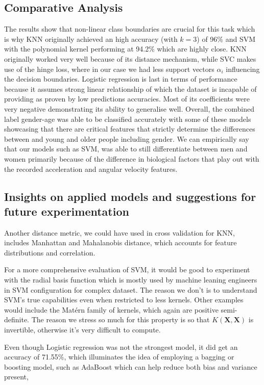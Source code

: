 \documentclass[10pt,twocolumn]{article}
\begin{document}
\subsection{Comparative Analysis}
The results show that non-linear class boundaries are crucial for this task which is why KNN originally achieved an high accuracy (with $k=3$) of 96\% and SVM with the polynomial kernel performing at 94.2\% which are highly close. KNN originally worked very well because of its distance mechanism, while SVC makes use of the hinge loss, where in our case we had less support vectors $\alpha_i$ influencing the decision boundaries. Logistic regression is last in terms of performance because it assumes strong linear relationship of which the dataset is incapable of providing as proven by low predictions accuracies. Most of its coefficients were very negative demonstrating its ability to generalise well. Overall, the combined label gender-age was able to be classified accurately with some of these models showcasing that there are critical features that strictly determine the differences between and young and older people including gender. We can empirically say that our models such as SVM, was able to still differentiate between men and women primarily because of the difference in biological factors that play out with the recorded  acceleration and angular velocity features.
\subsection{Insights on applied models and suggestions for future experimentation}
Another distance metric, we could have used in cross validation for KNN, includes Manhattan and Mahalanobis distance, which accounts for feature distributions and correlation.

For a more comprehensive evaluation of SVM, it would be good to experiment with the radial basis function which is mostly used by machine leaning engineers in SVM configuration for complex dataset. The reason we don't is to understand SVM's true capabilities even when restricted to less kernels. Other examples would include the Matérn family of kernels, which again are positive semi-definite. The reason we stress so much for this property is so that $\mathbf{}{K}(\mathbf{X},\mathbf{X})$ is invertible, otherwise it's very difficult to compute.

Even though Logistic regression was not the strongest model, it did get an accuracy of 71.55\%, which illuminates the idea of employing a bagging or boosting model, such as AdaBoost which can help reduce both bias and variance present,
\end{document}
